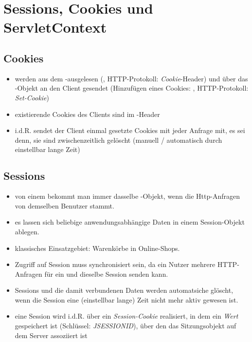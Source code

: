 \section{Sessions, Cookies und ServletContext}

\subsection{Cookies}

\begin{itemize}
    \item werden aus dem -ausgelesen (, HTTP-Protokoll: \textit{Cookie}-Header) und über das -Objekt an den Client gesendet (Hinzufügen eines Cookies: , HTTP-Protokoll: \textit{Set-Cookie})
    \item existierende Cookies des Clients sind im -Header
    \item i.d.R. sendet der Client einmal gesetzte Cookies mit jeder Anfrage mit, es sei denn, sie sind zwischenzeitlich gelöscht (manuell / automatisch durch einstellbar lange Zeit)
\end{itemize}


\subsection{Sessions}
\begin{itemize}
    \item von einem  bekommt man immer dasselbe -Objekt, wenn die Http-Anfragen von demselben Benutzer stammt.
    \item es lassen sich beliebige anwendungsabhängige Daten in einem Session-Objekt ablegen.
    \item klassisches Einsatzgebiet: Warenkörbe in Online-Shops.
    \item Zugriff auf Session muss synchronisiert sein, da ein Nutzer mehrere HTTP-Anfragen für ein und dieselbe Session senden kann.
    \item Sessions und die damit verbundenen Daten werden automatsiche glöscht, wenn die Session eine (einstellbar lange) Zeit nicht mehr aktiv gewesen ist.
    \item eine Session wird i.d.R. über ein \textit{Session-Cookie} realisiert, in dem ein \textit{Wert} gespeichert ist (Schlüssel: \textit{JSESSIONID}), über den das Sitzungsobjekt auf dem Server assoziiert ist
\end{itemize}


